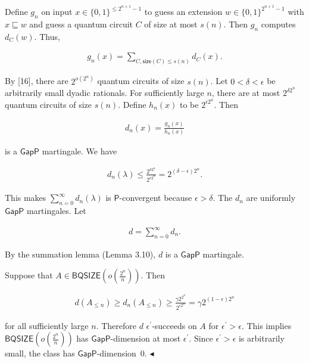 Define $g_{n}$ on input $x\in\{0,1\}^{\leq 2^{n+1}-1}$ to guess an extension $w\in\{0,1\}^{2^{n+1}-1}$ with $x\sqsubseteq w$ and guess a quantum circuit $C$ of size at most $s(n)$. Then $g_{n}$ computes $d_{C}(w)$. Thus,\par


\[\begin{gathered}
g_{n}(x)=\sum\limits_{C,\mathsf{size}(C)\leq s(n)}d_{C}(x).
\end{gathered}\]




By [16], there are $2^{o(2^{n})}$ quantum circuits of size $s(n)$. Let $0<\delta<\epsilon$ be arbitrarily small dyadic rationals. For sufficiently large $n$, there are at most $2^{\delta 2^{n}}$ quantum circuits of size $s(n)$.
Define $h_{n}(x)$ to be $2^{\epsilon 2^{n}}$. Then\par


\[\begin{gathered}
d_{n}(x)=\frac{g_{n}(x)}{h_{n}(x)}
\end{gathered}\]


is a $\mathsf{GapP}$ martingale. We have\par


\[\begin{gathered}
d_{n}(\lambda)\leq\frac{2^{\delta 2^{n}}}{2^{\epsilon 2^{n}}}=2^{(\delta-\epsilon)2^{n}}.
\end{gathered}\]


This makes $\sum\limits_{n=0}^{\infty}d_{n}(\lambda)$ is $\mathsf{P}$-convergent because $\epsilon>\delta$. The $d_{n}$ are uniformly $\mathsf{GapP}$ martingales.
Let\par


\[\begin{gathered}
d=\sum\limits_{n=0}^{\infty}d_{n}.
\end{gathered}\]


By the summation lemma (Lemma 3.10), $d$ is a $\mathsf{GapP}$ martingale.\par




Suppose that $A\in\mathsf{BQSIZE}(o(\frac{2^{n}}{n}))$. Then\par


\[\begin{gathered}
d(A_{\leq n})\geq d_{n}(A_{\leq n})\geq\frac{\gamma 2^{2^{n}}}{2^{\epsilon 2^{n}}}=\gamma 2^{(1-\epsilon)2^{n}}
\end{gathered}\]


for all sufficiently large $n$. Therefore $d$ $\epsilon^{\prime}$-succeeds on $A$ for $\epsilon^{\prime}>\epsilon$. This implies $\mathsf{BQSIZE}(o(\frac{2^{n}}{n}))$ has $\mathsf{GapP}$-dimension at most $\epsilon^{\prime}$. Since $\epsilon^{\prime}>\epsilon$ is arbitrarily small, the class has $\mathsf{GapP}$-dimension 0.
$\blacktriangleleft$\par



